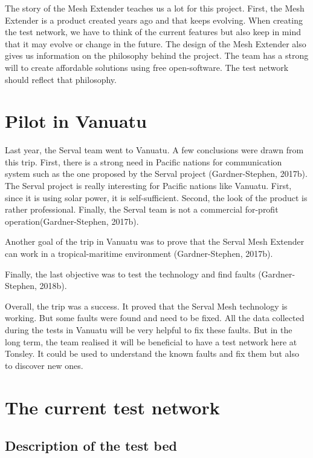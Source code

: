The story of the Mesh Extender teaches us a lot for this project. First, the Mesh Extender is a product created years ago and that keeps evolving. When creating the test network, we have to think of the current features but also keep in mind that it may evolve or change in the future. 
The design of the Mesh Extender also gives us information on the philosophy behind the project. The team has a strong will to create affordable solutions using free open-software. The test network should reflect that philosophy.




\section{Pilot in Vanuatu}

Last year, the Serval team went to Vanuatu. A few conclusions were drawn from this trip. First, there is a strong need in Pacific nations for communication system such as the one proposed by the Serval project (Gardner-Stephen, 2017b). The Serval project is really interesting for Pacific nations like Vanuatu. First, since it is using solar power, it is self-sufficient. Second, the look of the product is rather professional. Finally, the Serval team is not a commercial for-profit operation(Gardner-Stephen, 2017b). 

Another goal of the trip in Vanuatu was to prove that the Serval Mesh Extender can work in a tropical-maritime environment (Gardner-Stephen, 2017b).

Finally, the last objective was to test the technology and find faults (Gardner-Stephen, 2018b).

Overall, the trip was a success. It proved that the Serval Mesh technology is working. But some faults were found and need to be fixed. All the data collected during the tests in Vanuatu will be very helpful to fix these faults. But in the long term, the team realised it will be beneficial to have a test network here at Tonsley. It could be used to understand the known faults and fix them but also to discover new ones.






\section{The current test network}
\subsection{Description of the test bed}


